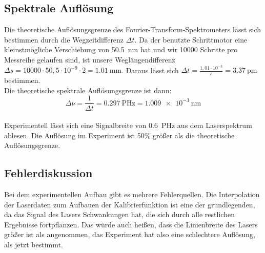 \documentclass[10pt,a4paper]{article}
\begin{document}
\subsection{Spektrale Auflösung}
Die theoretische Auflösungsgrenze des Fourier-Transform-Spektrometers lässt sich bestimmen durch die Wegzeitdifferenz $\Delta t$. Da der benutzte Schrittmotor eine kleinstmögliche Verschiebung von \qty{50,5}{\nm} hat und wir 10000 Schritte pro Messreihe gelaufen sind, ist unsere Weglängendifferenz $\Delta s = 10000 \cdot 50,5 \cdot 10^{-9} \cdot 2 = \qty{1,01}{\mm}$.
Daraus lässt sich $\Delta t = \frac{1,01 \cdot 10^{-3}}{c} = \qty{3,37}{\pm}$ bestimmen.\\
Die theoretische spektrale Auflösungsgrenze ist dann:
$$\Delta\nu=\frac{1}{\Delta t}=\qty{0,297}{\peta\hertz}=\qty{1.009e-3}{\nm}$$
\\
Experimentell lässt sich eine Signalbreite von \qty{0,6}{\peta\hertz} aus dem Laserspektrum ablesen. Die Auflösung im Experiment ist 50\% größer als die theoretische Auflösungsgrenze.

\subsection{Fehlerdiskussion}
Bei dem experimentellen Aufbau gibt es mehrere Fehlerquellen. Die Interpolation der Laserdaten zum Aufbauen der Kalibrierfunktion ist eine der grundlegenden, da das Signal des Lasers Schwankungen hat, die sich durch alle restlichen Ergebnisse fortpflanzen. Das würde auch heißen, dass die Linienbreite des Lasers größer ist als angenommen, das Experiment hat also eine schlechtere Auflösung, als jetzt bestimmt.
\end{document}
